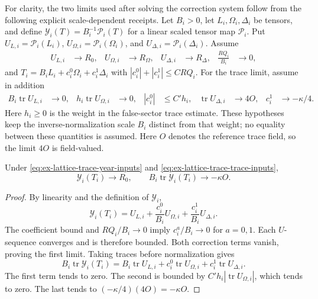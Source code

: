 For clarity, the two limits used after solving the correction system follow
from the following explicit scale-dependent receipts. Let $B_i>0$, let
$L_i,\Omega_i,\Delta_i$ be tensors, and define
$\mathcal Y_i(T)=B_i^{-1}\mathcal P_i(T)$ for a linear scaled tensor map
$\mathcal P_i$. Put $U_{L,i}=\mathcal P_i(L_i)$,
$U_{\Omega,i}=\mathcal P_i(\Omega_i)$, and
$U_{\Delta,i}=\mathcal P_i(\Delta_i)$. Assume
\begin{align}
 U_{L,i}&\longrightarrow R_0,
 &U_{\Omega,i}&\longrightarrow R_\Omega,
 &U_{\Delta,i}&\longrightarrow R_\Delta,
 &\frac{RQ_i}{B_i}&\longrightarrow0,
 \label{eq:ex-lattice-trace-year-inputs}
\end{align}
and $T_i=B_iL_i+c_i^0\Omega_i+c_i^1\Delta_i$ with
$|c_i^0|+|c_i^1|\le C RQ_i$. For the trace limit, assume in addition
\begin{align}
 B_i\operatorname{tr}U_{L,i}&\longrightarrow0,
 &h_i\operatorname{tr}U_{\Omega,i}&\longrightarrow0,
 &|c_i^0|&\le C' h_i,
 &\operatorname{tr}U_{\Delta,i}&\longrightarrow4O,
 &c_i^1&\longrightarrow-\kappa/4.
 \label{eq:ex-lattice-trace-trace-inputs}
\end{align}
Here $h_i\ge0$ is the weight in the false-sector trace estimate. These
hypotheses keep the inverse-normalization scale $B_i$ distinct from that
weight; no equality between these quantities is assumed.
Here $O$ denotes the reference trace field, so the limit $4O$ is
field-valued.

\begin{lemma}
\label{lem:ex-lattice-trace-correction-limits}
Under \eqref{eq:ex-lattice-trace-year-inputs} and
\eqref{eq:ex-lattice-trace-trace-inputs},
\[
 \mathcal Y_i(T_i)\longrightarrow R_0,
 \qquad
 B_i\operatorname{tr}\mathcal Y_i(T_i)\longrightarrow-\kappa O.
\]
\end{lemma}
\begin{proof}
By linearity and the definition of $\mathcal Y_i$,
\[
 \mathcal Y_i(T_i)=U_{L,i}
 +\frac{c_i^0}{B_i}U_{\Omega,i}
 +\frac{c_i^1}{B_i}U_{\Delta,i}.
\]
The coefficient bound and $RQ_i/B_i\to0$ imply
$c_i^a/B_i\to0$ for $a=0,1$. Each $U$-sequence converges and is therefore
bounded. Both correction terms vanish, proving the first limit. Taking traces
before normalization gives
\[
 B_i\operatorname{tr}\mathcal Y_i(T_i)
 =B_i\operatorname{tr}U_{L,i}
 +c_i^0\operatorname{tr}U_{\Omega,i}
 +c_i^1\operatorname{tr}U_{\Delta,i}.
\]
The first term tends to zero. The second is bounded by
$C'h_i|\operatorname{tr}U_{\Omega,i}|$, which tends to zero. The last tends
to $(-\kappa/4)(4O)=-\kappa O$.
\end{proof}

